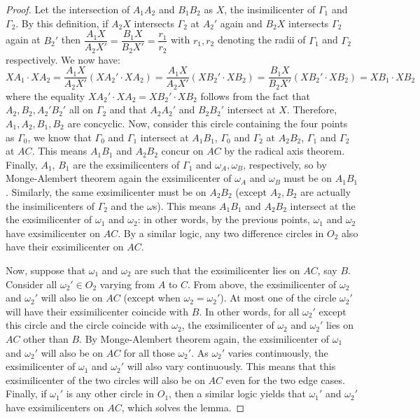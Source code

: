 \documentclass[11pt]{article}
\newcommand{\<}{\langle}
\renewcommand{\>}{\rangle}
\begin{document}
\begin{enumerate}
\begin{proof}
    	Let the intersection of $A_1A_2$ and $B_1B_2$ as $X$, the insimilicenter of $\Gamma_1$ and $\Gamma_2$. By this definition, if $A_2X$ intersects $\Gamma_2$ at $A_2'$ again and $B_2X$ intersects $\Gamma_2$ again at $B_2'$ then $\dfrac{A_1X}{A_2X'}=\dfrac{B_1X}{B_2X'}=\dfrac{r_1}{r_2}$ with $r_1, r_2$ denoting the radii of $\Gamma_1$ and $\Gamma_2$ respectively. We now have: 
    	\[
    	XA_1\cdot XA_2 = \dfrac{A_1X}{A_2X'} (XA_2' \cdot XA_2) = \dfrac{A_1X}{A_2X'} (XB_2' \cdot XB_2)
    	= \dfrac{B_1X}{B_2X'} (XB_2' \cdot XB_2) = XB_1\cdot XB_2
    	\]
    	where the equality $XA_2' \cdot XA_2 = XB_2' \cdot XB_2$ follows from the fact that $A_2, B_2, A_2' B_2'$ all on $\Gamma_2$ and that $A_2A_2'$ and $B_2B_2'$ intersect at $X$. 
    	Therefore, $A_1, A_2, B_1, B_2$ are concyclic. Now, consider this circle containing the four points as $\Gamma_0$, we know that $\Gamma_0$ and $\Gamma_1$ intersect at $A_1B_1$, $\Gamma_0$ and $\Gamma_2$ at $A_2B_2$, $\Gamma_1$ and $\Gamma_2$ at $AC$. This means $A_1B_1$ and $A_2B_2$ concur on $AC$ by the radical axis theorem. 
    	Finally, $A_1$, $B_1$ are the exsimilicenters of $\Gamma_1$ and $\omega_A, \omega_B$, respectively, so by Monge-Alembert theorem again the exsimilicenter of $\omega_A$ and $\omega_B$ must be on $A_1B_1$. Similarly, the same exsimilicenter must be on $A_2B_2$ (except $A_2, B_2$ are actually the insimilicenters of $\Gamma_2$ and the $\omega$s). This means $A_1B_1$ and $A_2B_2$ intersect at the the exsimilicenter of $\omega_1$ and $\omega_2$: in other words, by the previous points, $\omega_1$ and $\omega_2$ have exsimilicenter on $AC$. 
    	By a similar logic, any two difference circles in $O_2$ also have their exsimilicenter on $AC$. 
    	
    	Now, suppose that $\omega_1$ and $\omega_2$ are such that the exsimilicenter lies on $AC$, say $B$. 
    	Consider all $\omega_2'\in O_2$ varying from $A$ to $C$. From above, the exsimilicenter of $\omega_2$ and $\omega_2'$ will also lie on $AC$ (except when $\omega_2=\omega_2'$). At most one of the circle $\omega_2'$ will have their exsimilicenter coincide with $B$. In other words, for all $\omega_2'$ except this circle and the circle coincide with $\omega_2$, the exsimilicenter of $\omega_2$ and $\omega_2'$ lies on $AC$ other than $B$. By Monge-Alembert theorem again, the exsimilicenter of $\omega_1$ and $\omega_2'$ will also be on $AC$ for all those $\omega_2'$. As $\omega_2'$ varies continuously, the exsimilicenter of $\omega_1$ and $\omega_2'$ will also vary continuously. This means that this exsimilicenter of the two circles will also be on $AC$ even for the two edge cases. 
    	Finally, if $\omega_1'$ is any other circle in $O_1$, then a similar logic yields that $\omega_1'$ and $\omega_2'$ have exsimilicenters on $AC$, which solves the lemma. 
    \end{proof}
	

\end{enumerate}
\end{document}
